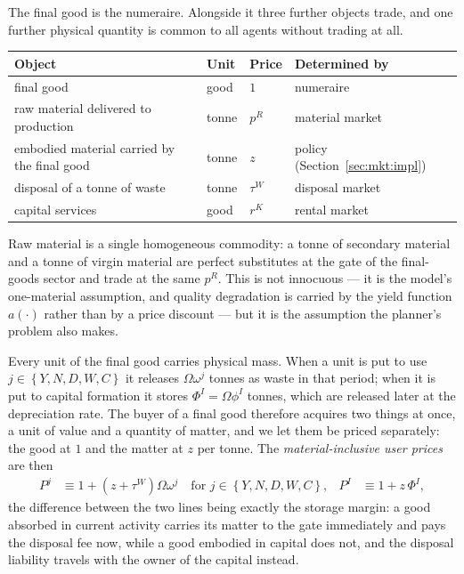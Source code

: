  The final good is the numeraire. Alongside it three further objects trade, and one further physical quantity is common to all agents without trading at all.
\begin{center}
\begin{tabular}{llll}
\toprule
Object & Unit & Price & Determined by \\
\midrule
final good & good & $1$ & numeraire \\
raw material delivered to production & tonne & $p^R$ & material market \\
embodied material carried by the final good & tonne & $z$ & policy (Section~\ref{sec:mkt:impl}) \\
disposal of a tonne of waste & tonne & $\tau^W$ & disposal market \\
capital services & good & $r^K$ & rental market \\
\bottomrule
\end{tabular}
\end{center}
Raw material is a single homogeneous commodity: a tonne of secondary material and a tonne of virgin material are perfect substitutes at the gate of the final-goods sector and trade at the same $p^R$. This is not innocuous --- it is the model's one-material assumption, and quality degradation is carried by the yield function $a\left(\cdot\right)$ rather than by a price discount --- but it is the assumption the planner's problem also makes.

 Every unit of the final good carries physical mass. When a unit is put to use $j\in\left\{Y,N,D,W,C\right\}$ it releases $\Omega\omega^j$ tonnes as waste in that period; when it is put to capital formation it stores $\Phi^I=\Omega\phi^I$ tonnes, which are released later at the depreciation rate. The buyer of a final good therefore acquires two things at once, a unit of value and a quantity of matter, and we let them be priced separately: the good at $1$ and the matter at $z$ per tonne. The \emph{material-inclusive user prices} are then
\begin{align}
P^j &\equiv 1+\left(z+\tau^W\right)\Omega\omega^j
\quad\text{for }j\in\left\{Y,N,D,W,C\right\},
&
P^I &\equiv 1+z\,\Phi^I ,
\label{eq:mkt:userprices}
\end{align}
the difference between the two lines being exactly the storage margin: a good absorbed in current activity carries its matter to the gate immediately and pays the disposal fee now, while a good embodied in capital does not, and the disposal liability travels with the owner of the capital instead.

